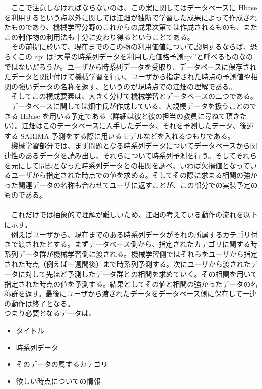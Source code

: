 \documentclass{scrartcl}
\begin{document}
\begin{table}[htbp]
　ここで注意しなければならないのは、この案に関してはデータベースに Hbase を利用するという点以外に関しては江畑が独断で学習した成果によって作成されたものであり、機械学習分野のこれからの成果次第では作成されるものも、またこの制作物の利用法も十分に変わり得るということである。\\
　その前提に於いて、現在までのこの物の利用価値について説明するならば、恐らくこの api は``大量の時系列データを利用した価格予測api''と呼べるものなのではないだろうか。ユーザから時系列データを受取り、データベースに保存されたデータと関連付けて機械学習を行い、ユーザから指定された時点の予測値や相関の強いデータの名称を返す、というのが現時点での江畑の理解である。\\
　そしてこの構成要素は、大きく分けて機械学習とデータベースの二つである。\\
　データベースに関しては畑中氏が作成している、大規模データを扱うことのできる HBase を用いる予定である（詳細は彼と彼の担当の教員に尋ねて頂きたい）。江畑はこのデータベースに入手したデータ、それを予測したデータ、後述する SARIMA 予測をする際に用いるモデルなどを入れるつもりである。\\
　機械学習部分では、まず問題となる時系列データについてデータベースから関連性のあるデータを読み出し、それらについて時系列予測を行う。そしてそれらを元にして問題となった時系列データとの相関を調べ、いわば欠損値となっているユーザから指定された時点での値を求める。そしてその際に求まる相関の強かった関連データの名称も合わせてユーザに返すことが、この部分での実装予定のものである。\\
　\\
　これだけでは抽象的で理解が難しいため、江畑の考えている動作の流れを以下に示す。\\
　例えばユーザから、現在までのある時系列データがそれの所属するカテゴリ付きで渡されたとする。まずデータベース側から、指定されたカテゴリに関する時系列データ群が機械学習側に渡される。機械学習側ではそれらをユーザから指定された時点（例えば一週間後）まで時系列予測する。次にユーザから渡されたデータに対して先ほど予測したデータ群との相関を求めていく。その相関を用いて指定された時点の値を予測する。結果としてその値と相関の強かったデータの名称群を返す。最後にユーザから渡されたデータをデータベース側に保存して一連の動作は終了となる。\\

つまり必要となるデータは、\\
\begin{itemize}
\item タイトル\\
\item 時系列データ\\
\item そのデータの属するカテゴリ\\
\item 欲しい時点についての情報\\
\end{itemize}


\end{table}
\end{document}
